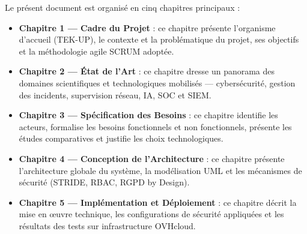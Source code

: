 Le présent document est organisé en cinq chapitres principaux :

\begin{itemize}
    \item \textbf{Chapitre 1 — Cadre du Projet} : ce chapitre présente l'organisme d'accueil (TEK-UP), le contexte et la problématique du projet, ses objectifs et la méthodologie agile SCRUM adoptée.
    \item \textbf{Chapitre 2 — État de l'Art} : ce chapitre dresse un panorama des domaines scientifiques et technologiques mobilisés — cybersécurité, gestion des incidents, supervision réseau, IA, SOC et SIEM.
    \item \textbf{Chapitre 3 — Spécification des Besoins} : ce chapitre identifie les acteurs, formalise les besoins fonctionnels et non fonctionnels, présente les études comparatives et justifie les choix technologiques.
    \item \textbf{Chapitre 4 — Conception de l'Architecture} : ce chapitre présente l'architecture globale du système, la modélisation UML et les mécanismes de sécurité (STRIDE, RBAC, RGPD by Design).
    \item \textbf{Chapitre 5 — Implémentation et Déploiement} : ce chapitre décrit la mise en \oe{}uvre technique, les configurations de sécurité appliquées et les résultats des tests sur infrastructure OVHcloud.
\end{itemize}
